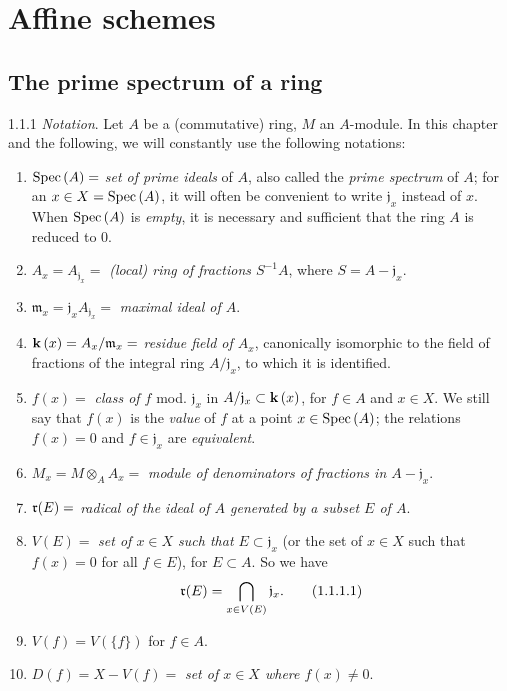 \setcounter{section}{0}
\section{Affine schemes}
\label{1-schemes-1}

\setcounter{subsection}{0}
\subsection{The prime spectrum of a ring}
\label{1-schemes-1.1}

\begin{env}{1.1.1}
\label{env-1.1.1.1}
\emph{Notation}. Let $A$ be a (commutative) ring, $M$ an $A$-module. In
this chapter and the following, we will constantly use the following notations:
\begin{enumerate}[label=--]
  \item ${\mathop{\mathrm{Spec}}\nolimits}\,(A)=$ \emph{set of prime ideals} of $A$, also called the
        \emph{prime spectrum} of $A$; for an $x\in X={\mathop{\mathrm{Spec}}\nolimits}\,(A)$, it will often be
        convenient to write $\mathfrak{j}_x$ instead of $x$. When ${\mathop{\mathrm{Spec}}\nolimits}\,(A)$ is
        \emph{empty}, it is necessary and sufficient that the ring $A$ is
        reduced to $0$.
  \item $A_x=A_{\mathfrak{j}_x}=$ \emph{(local) ring of fractions $S^{-1}A$},
        where $S=A-\mathfrak{j}_x$.
  \item $\mathfrak{m}_x=\mathfrak{j}_x A_{\mathfrak{j}_x}=$ \emph{maximal ideal of $A$}.
  \item $\mathbf{k}\,(x)=A_x/\mathfrak{m}_x=$ \emph{residue field of $A_x$},
        canonically isomorphic to the field of fractions
        of the integral ring $A/\mathfrak{j}_x$, to which it is identified.
  \item $f(x)=$ \emph{class of $f$} mod. $\mathfrak{j}_x$ in
        $A/\mathfrak{j}_x\subset\mathbf{k}\,(x)$,
        for $f\in A$ and $x\in X$. We still say that $f(x)$ is the \emph{value}
        of $f$ at a point $x\in{\mathop{\mathrm{Spec}}\nolimits}\,(A)$; the relations $f(x)=0$ and $f\in\mathfrak{j}_x$
        are \emph{equivalent}.
  \item $M_x=M\otimes_A A_x=$ \emph{module of denominators of fractions in
        $A-\mathfrak{j}_x$}.
  \item $\mathfrak{r}(E)=$ \emph{radical of the ideal of $A$ generated by a subset $E$ of $A$}.
  \item $V(E)=$ \emph{set of $x\in X$ such that $E\subset\mathfrak{j}_x$} (or the set of
        $x\in X$ such that $f(x)=0$ for all $f\in E$), for $E\subset A$. So we have
        \[
          \mathfrak{r}(E)=\bigcap_{x\in V(E)}\mathfrak{j}_x.
          \tag{1.1.1.1}
        \]
  \item $V(f)=V(\{f\})$ for $f\in A$.
  \item $D(f)=X-V(f)=$ \emph{set of $x\in X$ where $f(x)\neq 0$}.
\end{enumerate}
\end{env}

